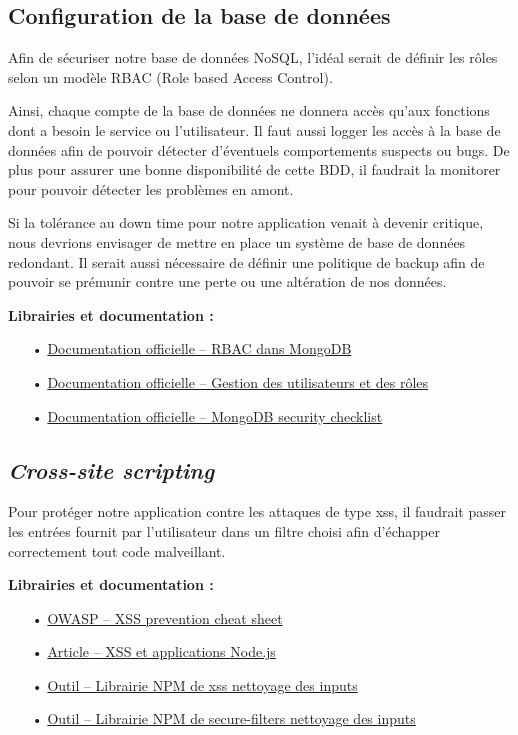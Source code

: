 \documentclass[12pt]{article}
\begin{document}
\subsection{Configuration de la base de données}
\label{ssec:cm-configdb}

Afin de sécuriser notre base de données NoSQL, l'idéal serait de définir les rôles selon un modèle RBAC (Role based Access Control).

Ainsi, chaque compte de la base de données ne donnera accès qu'aux fonctions dont a besoin le service ou l'utilisateur. Il faut aussi logger les accès à la base de données afin de pouvoir détecter d'éventuels comportements suspects ou bugs. De plus pour assurer une bonne disponibilité de cette BDD, il faudrait la monitorer pour pouvoir détecter les problèmes en amont.

Si la tolérance au down time pour notre application venait à devenir critique, nous devrions envisager de mettre en place un système de base de données redondant. Il serait aussi nécessaire de définir une politique de backup afin de pouvoir se prémunir contre une perte ou une altération de nos données.

\medskip
\textbf{Librairies et documentation :}

\begin{itemize}
\item[•] \href{https://docs.mongodb.com/manual/core/authorization/}{Documentation officielle -- RBAC dans MongoDB}
\item[•] \href{https://docs.mongodb.com/manual/tutorial/manage-users-and-roles/}{Documentation officielle -- Gestion des utilisateurs et des rôles}
\item[•] \href{https://docs.mongodb.com/manual/administration/security-checklist/}{Documentation officielle -- MongoDB security checklist}
\end{itemize}

\subsection{\emph{Cross-site scripting}}
\label{ssec:cm-xss}

Pour protéger notre application contre les attaques de type xss, il faudrait passer les entrées fournit par l'utilisateur dans un filtre choisi afin d'échapper correctement tout code malveillant.

\medskip
\textbf{Librairies et documentation :}

\begin{itemize}
\item[•] \href{https://www.owasp.org/index.php/XSS_(Cross_Site_Scripting)_Prevention_Cheat_Sheet}{OWASP -- XSS prevention cheat sheet}
\item[•] \href{http://scottksmith.com/blog/2015/06/22/secure-node-apps-against-owasp-top-10-cross-site-scripting/}{Article -- XSS et applications Node.js}
\item[•] \href{https://www.npmjs.com/package/xss}{Outil -- Librairie NPM de xss nettoyage des inputs}
\item[•] \href{https://www.npmjs.com/package/secure-filters}{Outil -- Librairie NPM de secure-filters nettoyage des inputs}
\end{itemize}
\end{document}
